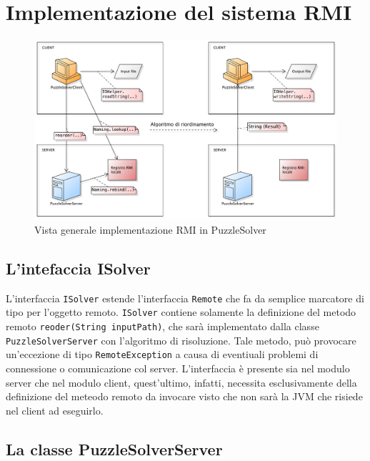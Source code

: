 %
%

\section{Implementazione del sistema RMI}

\begin{figure}[htbp]
    \centering
    \centerline{\includegraphics[scale=0.33]{./images/rmi.pdf}}
    \caption{Vista generale implementazione RMI in PuzzleSolver}
\end{figure}

\subsection{L'intefaccia ISolver}

L'interfaccia \texttt{ISolver} estende l'interfaccia \texttt{Remote} che fa da semplice marcatore di tipo
per l'oggetto remoto. \texttt{ISolver} contiene solamente la definizione del metodo remoto \texttt{reoder(String inputPath)},
che sarà implementato dalla classe \texttt{PuzzleSolverServer} con l'algoritmo di risoluzione. Tale metodo, può provocare
un'eccezione di tipo \texttt{RemoteException} a causa di eventiuali problemi di connessione o comunicazione col server.
L'interfaccia è presente sia nel modulo server che nel modulo client, quest'ultimo, infatti, necessita esclusivamente della
definizione del meteodo remoto da invocare visto che non sarà la JVM che risiede nel client ad eseguirlo.


\subsection{La classe PuzzleSolverServer}

